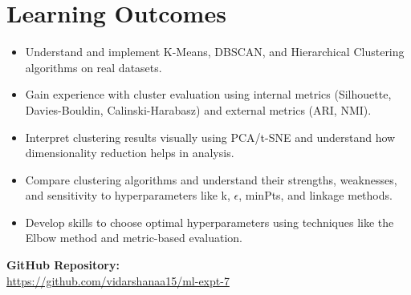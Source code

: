 \documentclass[11pt]{article}
\begin{document}
\vspace{0.3cm}
\section{Learning Outcomes}
\begin{itemize}
    \item Understand and implement K-Means, DBSCAN, and Hierarchical Clustering algorithms on real datasets.
    \item Gain experience with cluster evaluation using internal metrics (Silhouette, Davies-Bouldin, Calinski-Harabasz) and external metrics (ARI, NMI).
    \item Interpret clustering results visually using PCA/t-SNE and understand how dimensionality reduction helps in analysis.
    \item Compare clustering algorithms and understand their strengths, weaknesses, and sensitivity to hyperparameters like k, $\epsilon$, minPts, and linkage methods.
    \item Develop skills to choose optimal hyperparameters using techniques like the Elbow method and metric-based evaluation.
\end{itemize}

\vspace{0.3cm}
\noindent
\textbf{GitHub Repository:} \\
\href{https://github.com/vidarshanaa15/ml-expt-7}{https://github.com/vidarshanaa15/ml-expt-7}
\end{document}
